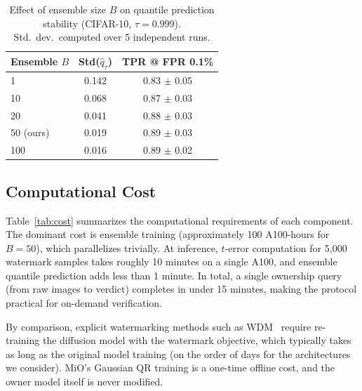 \documentclass[sigconf, review, anonymous]{acmart}
\begin{document}
\begin{table}[h]
\caption{Effect of ensemble size $B$ on quantile prediction stability (CIFAR-10, $\tau = 0.999$). Std.\ dev.\ computed over 5 independent runs.}
\label{tab:ensemble_ablation}
\begin{center}
\begin{small}
\begin{tabular}{lcc}
\toprule
Ensemble $B$ & Std($\hat{q}_\tau$) & TPR @ FPR 0.1\% \\
\midrule
1 & 0.142 & 0.83 $\pm$ 0.05 \\
10 & 0.068 & 0.87 $\pm$ 0.03 \\
20 & 0.041 & 0.88 $\pm$ 0.03 \\
50 (ours) & 0.019 & 0.89 $\pm$ 0.03 \\
100 & 0.016 & 0.89 $\pm$ 0.02 \\
\bottomrule
\end{tabular}
\end{small}
\end{center}
\end{table}

\subsection{Computational Cost}
\label{app:cost}

Table~\ref{tab:cost} summarizes the computational requirements of each component. The dominant cost is ensemble training (approximately 100 A100-hours for $B = 50$), which parallelizes trivially. At inference, $t$-error computation for 5{,}000 watermark samples takes roughly 10 minutes on a single A100, and ensemble quantile prediction adds less than 1 minute. In total, a single ownership query (from raw images to verdict) completes in under 15 minutes, making the protocol practical for on-demand verification.

By comparison, explicit watermarking methods such as WDM~\citep{peng2023protecting} require re-training the diffusion model with the watermark objective, which typically takes as long as the original model training (on the order of days for the architectures we consider). MiO's Gaussian QR training is a one-time offline cost, and the owner model itself is never modified.
\end{document}
